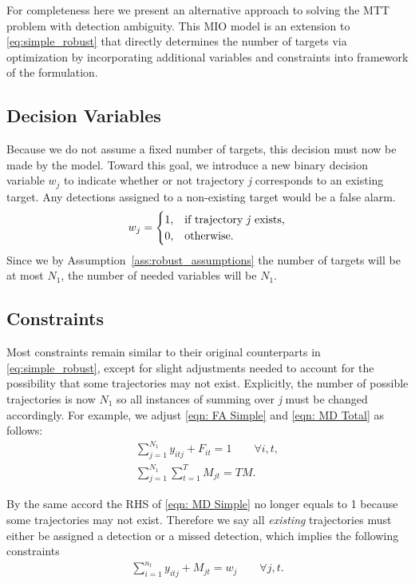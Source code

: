 For completeness here we present an alternative approach to solving the MTT problem with detection ambiguity. This MIO model is an extension to \eqref{eq:simple_robust} that directly determines the number of targets via optimization by incorporating additional variables and constraints into framework of the formulation. 

\subsection{Decision Variables}
Because we do not assume a fixed number of targets, this decision must now be made by the model. Toward this goal, we introduce a new binary decision variable $w_{j}$ to indicate whether or not trajectory \textit{j} corresponds to an existing target. Any detections assigned to a non-existing target would be a false alarm. 
\[w_{j} = 
\begin{cases}
1, & \text{if trajectory \textit{j} exists,}\\
0, & \text{otherwise.}
\end{cases}\]
Since we by Assumption~\ref{ass:robust_assumptions} the number of targets will be at most $N_1$, the number of needed variables will be $N_1$.

\subsection{Constraints}
Most constraints remain similar to their original counterparts in \eqref{eq:simple_robust}, except for slight adjustments needed to account for the possibility that some trajectories may not exist. Explicitly, the number of possible trajectories is now $N_{1}$ so all instances of summing over \textit{j} must be changed accordingly. For example, we adjust \eqref{eqn: FA Simple} and \eqref{eqn: MD Total} as follows: 
\begin{align*}
\sum_{j=1}^{N_{1}} y_{itj} + F_{it} = 1 \qquad \forall i,t,\\
\sum_{j=1}^{N_{1}} \sum_{t=1}^{T} M_{jt} = TM.
\end{align*}

By the same accord the RHS of \eqref{eqn: MD Simple} no longer equals to 1 because some trajectories may not exist. Therefore we say all \textit{existing} trajectories must either be assigned a detection or a missed detection, which implies the following constraints
\begin{align}\label{eqn: Existing Targets}
\sum_{i=1}^{n_{t}} y_{itj} + M_{jt} = w_{j} \qquad \forall j,t.
\end{align}

